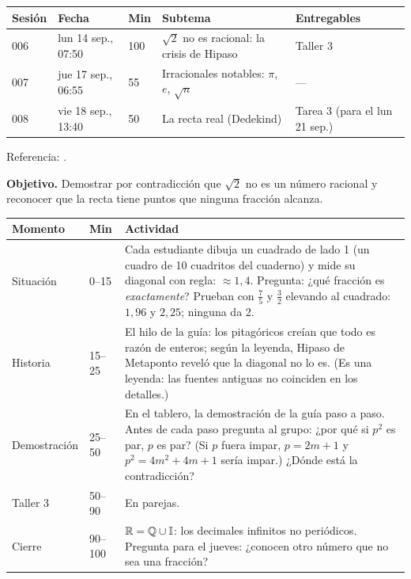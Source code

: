 \documentclass[11pt]{article}
\begin{document}
\encabezado*

\begin{center}
{\renewcommand{\arraystretch}{1.3}
\begin{tabularx}{\linewidth}{@{}l l l X l@{}}
  \toprule
  \textbf{Sesión} & \textbf{Fecha} & \textbf{Min} & \textbf{Subtema} & \textbf{Entregables}\\
  \midrule
  006 & lun 14 sep., 07:50 & 100 & $\sqrt{2}$ no es racional: la crisis de Hipaso & Taller 3\\
  007 & jue 17 sep., 06:55 & 55  & Irracionales notables: $\pi$, $e$, $\sqrt{n}$ & —\\
  008 & vie 18 sep., 13:40 & 50  & La recta real (Dedekind) & Tarea 3 (para el lun 21 sep.)\\
  \bottomrule
\end{tabularx}}
\end{center}

Referencia: .


\textbf{Objetivo.} Demostrar por contradicción que $\sqrt{2}$ no es un número racional y
reconocer que la recta tiene puntos que ninguna fracción alcanza.

\begin{center}
{\renewcommand{\arraystretch}{1.3}
\begin{tabularx}{\linewidth}{@{}l l X@{}}
  \toprule
  \textbf{Momento} & \textbf{Min} & \textbf{Actividad}\\
  \midrule
  Situación & 0–15 & Cada estudiante dibuja un cuadrado de lado 1 (un cuadro de 10
    cuadritos del cuaderno) y mide su diagonal con regla: $\approx 1{,}4$. Pregunta: ¿qué
    fracción es \emph{exactamente}? Prueban con $\frac{7}{5}$ y $\frac{3}{2}$ elevando al
    cuadrado: $1{,}96$ y $2{,}25$; ninguna da 2.\\
  Historia & 15–25 & El hilo de la guía: los pitagóricos creían que todo es razón de
    enteros; según la leyenda, Hipaso de Metaponto reveló que la diagonal no lo es. (Es una
    leyenda: las fuentes antiguas no coinciden en los detalles.)\\
  Demostración & 25–50 & En el tablero, la demostración de la guía paso a paso. Antes de cada
    paso pregunta al grupo: ¿por qué si $p^2$ es par, $p$ es par? (Si $p$ fuera impar,
    $p = 2m+1$ y $p^2 = 4m^2 + 4m + 1$ sería impar.) ¿Dónde está la contradicción?\\
  Taller 3 & 50–90 & En parejas.\\
  Cierre & 90–100 & $\mathbb{R} = \mathbb{Q} \cup \mathbb{I}$: los decimales infinitos no periódicos. Pregunta
    para el jueves: ¿conocen otro número que no sea una fracción?\\
  \bottomrule
\end{tabularx}}
\end{center}
\end{document}
